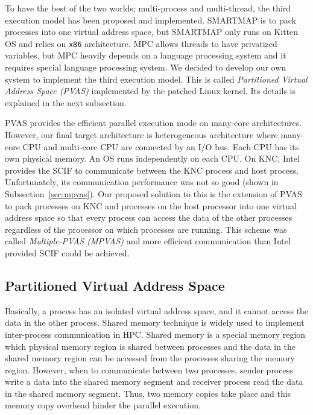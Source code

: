 To have the best of the two worlds; multi-process and multi-thread,
the third execution model has been proposed and implemented. SMARTMAP
is to pack processes into one virtual address space, but SMARTMAP only
runs on Kitten OS and relies on {\tt x86}
architecture\cite{Brightwell:2008:SOS:1413370.1413396}. MPC  
allows threads to have privatized variables, but MPC heavily depends
on a language processing system and it requires special language
processing system\cite{pjn2008}. We
decided to develop our own system to implement the third execution
model. This is called {\em Partitioned Virtual Address Space (PVAS)}
implemented by the patched Linux kernel. Its details is explained in
the next subsection. 

PVAS provides the efficient parallel execution mode on many-core
architectures. However, our final target architecture is heterogeneous
architecture where many-core CPU and multi-core CPU are connected by
an I/O bus\cite{mikiko:2013,shimosawa2014}. Each CPU has its own
physical memory. An OS runs 
independently on each CPU. On KNC, Intel provides the SCIF to
communicate between the KNC process and host 
process. Unfortunately, its communication performance was not so
good (shown in Subsection~\ref{sec:mpvas}). Our proposed solution to
this is the extension of PVAS to pack processes on KNC and processes
on the host processor into one virtual address space so that every
process can access the data of the other processes regardless of the
processor on which processes are running. This scheme was called
{\em Multiple-PVAS (MPVAS)} and more efficient communication than Intel
provided SCIF could be achieved. 

\subsection{Partitioned Virtual Address Space}\label{sec:pvas}

Basically, a process has an isolated virtual address space, and it
cannot access the data in the other process. Shared memory technique
is widely used to implement inter-process communication in HPC. Shared
memory is a special memory region which physical memory region is
shared between processes and the data in the shared memory region can
be accessed from the processes sharing the memory region. However,
when to communicate between two processes, sender process write a data
into the shared memory segment and receiver process read the data in
the shared memory segment. Thus, two memory copies take place and this
memory copy overhead hinder the parallel execution.

